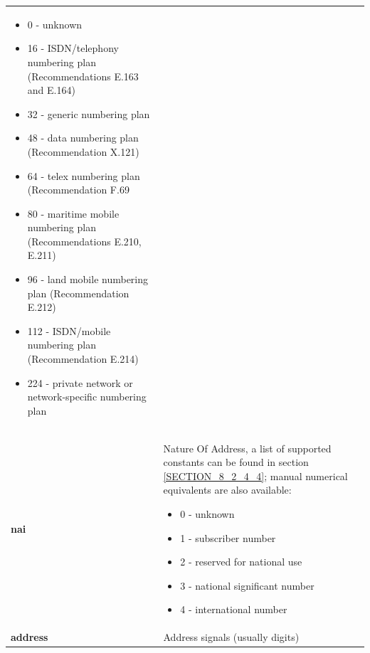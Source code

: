 \documentclass[a4paper,latin]{paper}
\begin{document}
\begin{tabularx}{\textwidth}{ | l | X |}
\begin{itemize}
							\setlength{\itemsep}{0pt}
							\setlength{\parskip}{0pt}
							\setlength{\parsep}{0pt} 
							\item 0 - unknown
							\item 16 - ISDN/telephony numbering plan (Recommendations E.163 and E.164)
							\item 32 - generic numbering plan
							\item 48 - data numbering plan (Recommendation X.121)
							\item 64 - telex numbering plan (Recommendation F.69
							\item 80 - maritime mobile numbering plan (Recommendations E.210, E.211)
							\item 96 - land mobile numbering plan (Recommendation E.212)
							\item 112 - ISDN/mobile numbering plan (Recommendation E.214)
							\item 224 - private network or network-specific numbering plan
						  \end{itemize} \\ 
	\textbf{nai}				& Nature Of Address, a list of supported constants can be found in
						  section \ref{SECTION_8_2_4_4}; manual numerical equivalents are also available: 
 						  \begin{itemize}
							\setlength{\itemsep}{0pt}
							\setlength{\parskip}{0pt}
							\setlength{\parsep}{0pt}
							\item 0 - unknown
							\item 1 - subscriber number
							\item 2 - reserved for national use
							\item 3 - national significant number
							\item 4 - international number
						  \end{itemize} \\ 
	\textbf{address}			& Address signals (usually digits) \\ 
	\hline
\end{tabularx}
\clearpage


\printglossary[type=\acronymtype]

\printglossary
\end{document}
